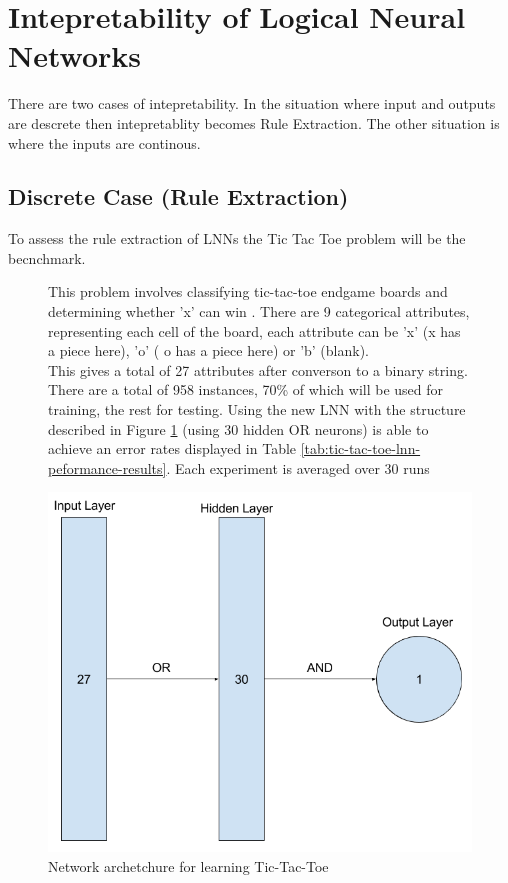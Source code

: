 \section{Intepretability of Logical Neural Networks}
There are two cases of intepretability. In the situation where input and outputs are descrete then intepretablity becomes Rule Extraction. The other situation is where the inputs are continous.

\subsection{Discrete Case (Rule Extraction)}
To assess the rule extraction of LNNs the Tic Tac Toe  \cite{Lichman:2013} problem will be the becnchmark. 


\begin{figure}[H]
	\centering
	\begin{minipage}[t]{0.5\textwidth}
		\vspace{0px}
		This problem involves classifying tic-tac-toe endgame boards and determining whether 'x' can win . There are 9 categorical attributes, representing each cell of the board, each attribute can be 'x' (x has a piece here), 'o' ( o has a piece here) or 'b' (blank).\\
	
		This gives a total of 27 attributes after converson to a binary string. There are a total of 958 instances, 70\% of which will be used for training, the rest for testing.  Using the new LNN with the structure described in Figure \ref{fig:tic-tac-toe-net} (using 30 hidden OR neurons) is able to achieve an error rates displayed in Table \ref{tab:tic-tac-toe-lnn-peformance-results}. Each experiment is averaged over 30 runs
	\end{minipage}
	\hspace{1px}
	\begin{minipage}[t]{0.48\textwidth}
		\vspace{0px}
		\includegraphics[width=\textwidth]{Tic-Tac-Toe-Net.png}
		\caption{Network archetchure for learning Tic-Tac-Toe}
		\label{fig:tic-tac-toe-net}
	\end{minipage}
	\hfill
\end{figure}
